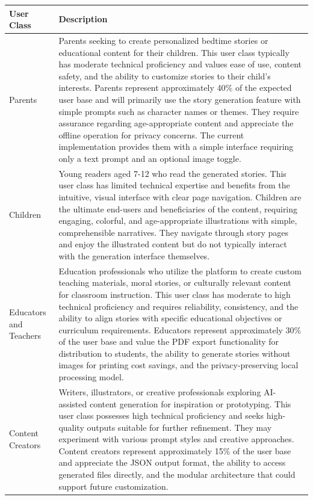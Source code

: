 \begin{table}[h]
\centering
\begin{tabular}{p{} p{}}
\hline
\textbf{User Class} & \textbf{Description} \\ \hline
Parents & Parents seeking to create personalized bedtime stories or educational content for their children. This user class typically has moderate technical proficiency and values ease of use, content safety, and the ability to customize stories to their child's interests. Parents represent approximately 40\% of the expected user base and will primarily use the story generation feature with simple prompts such as character names or themes. They require assurance regarding age-appropriate content and appreciate the offline operation for privacy concerns. The current implementation provides them with a simple interface requiring only a text prompt and an optional image toggle. \\ \hline
Children & Young readers aged 7-12 who read the generated stories. This user class has limited technical expertise and benefits from the intuitive, visual interface with clear page navigation. Children are the ultimate end-users and beneficiaries of the content, requiring engaging, colorful, and age-appropriate illustrations with simple, comprehensible narratives. They navigate through story pages and enjoy the illustrated content but do not typically interact with the generation interface themselves. \\ \hline
Educators and Teachers & Education professionals who utilize the platform to create custom teaching materials, moral stories, or culturally relevant content for classroom instruction. This user class has moderate to high technical proficiency and requires reliability, consistency, and the ability to align stories with specific educational objectives or curriculum requirements. Educators represent approximately 30\% of the user base and value the PDF export functionality for distribution to students, the ability to generate stories without images for printing cost savings, and the privacy-preserving local processing model. \\ \hline
Content Creators & Writers, illustrators, or creative professionals exploring AI-assisted content generation for inspiration or prototyping. This user class possesses high technical proficiency and seeks high-quality outputs suitable for further refinement. They may experiment with various prompt styles and creative approaches. Content creators represent approximately 15\% of the user base and appreciate the JSON output format, the ability to access generated files directly, and the modular architecture that could support future customization. \\ \hline

\end{tabular}
\end{table}
